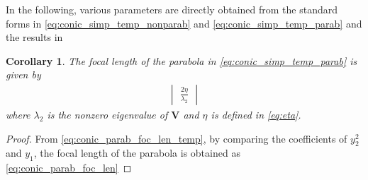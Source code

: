 \documentclass[]{interact}
\theoremstyle{plain}%
\newtheorem{corollary}[theorem]{Corollary}
\theoremstyle{definition}
\theoremstyle{remark}
\providecommand{\brak}[1]{\ensuremath{\left(#1\right)}}
\providecommand{\norm}[1]{\left\lVert#1\right\rVert}
\newcommand{\mydet}[1]{\ensuremath{\begin{vmatrix}#1\end{vmatrix}}}
\let\vec\mathbf
\begin{document}
In the following, various parameters are directly obtained from the standard forms  in  \eqref{eq:conic_simp_temp_nonparab} and \eqref{eq:conic_simp_temp_parab}
and the results in \cite{kemh103}
\begin{corollary}
  The focal length of the parabola in \eqref{eq:conic_simp_temp_parab} is given by 
  \begin{align}
    \mydet{\frac{2\eta}{\lambda_2}} 
    \label{eq:conic_parab_foc_len} 
    \end{align}    
    where $\lambda_2$ is the nonzero eigenvalue of $\vec{V}$ and $\eta$ is defined in \eqref{eq:eta}.
     \end{corollary}
\begin{proof}
From \eqref{eq:conic_parab_foc_len_temp}, by comparing the coefficients of $y_2^2$ and $y_1$, the focal length of the parabola is obtained as     \eqref{eq:conic_parab_foc_len} 
\end{proof}
\end{document}

